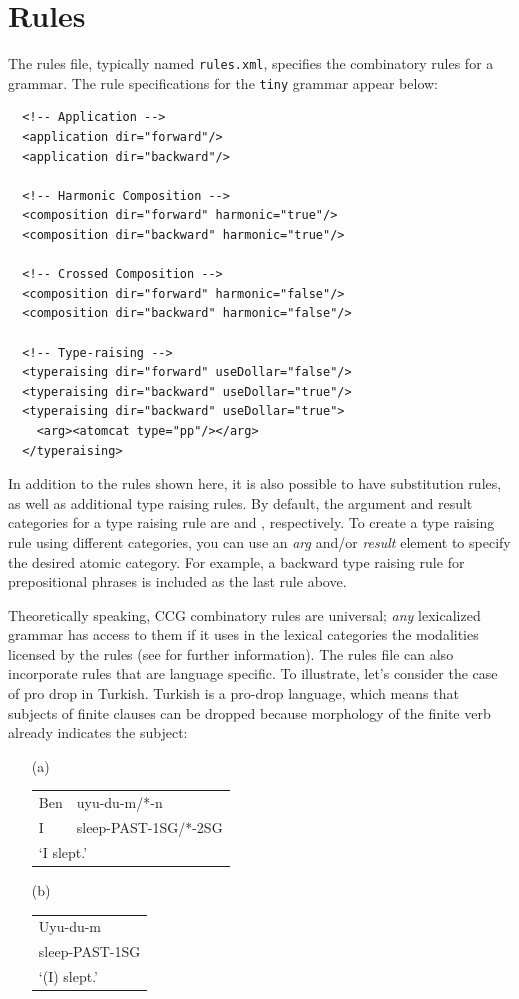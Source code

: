 \documentclass[11pt]{article}
\begin{document}
\section{Rules}
\label{rules}

The rules file, typically named \texttt{rules.xml}, specifies the
combinatory rules for a grammar. The rule specifications for the
\texttt{tiny} grammar appear below:

\begin{verbatim}
  <!-- Application -->
  <application dir="forward"/>
  <application dir="backward"/>

  <!-- Harmonic Composition -->
  <composition dir="forward" harmonic="true"/>
  <composition dir="backward" harmonic="true"/>

  <!-- Crossed Composition -->
  <composition dir="forward" harmonic="false"/>
  <composition dir="backward" harmonic="false"/>

  <!-- Type-raising -->
  <typeraising dir="forward" useDollar="false"/>
  <typeraising dir="backward" useDollar="true"/>
  <typeraising dir="backward" useDollar="true">
    <arg><atomcat type="pp"/></arg>
  </typeraising>
\end{verbatim}

\noindent In addition to the rules shown here, it is also possible to
have substitution rules, as well as additional type raising rules. By
default, the argument and result categories for a type raising rule are
 and , respectively. To create a type raising rule using
different categories, you can use an \textsl{arg} and/or \textsl{result}
element to specify the desired atomic category. For example, a backward
type raising rule for prepositional phrases is included as the last rule
above.

Theoretically speaking, CCG combinatory rules are universal; \emph{any}
lexicalized grammar has access to them if it uses in the lexical
categories the modalities licensed by the rules (see
\cite{Steedman/Baldridge:2003} for further information). The rules file
can also incorporate rules that are language specific. To illustrate,
let's consider the case of pro drop in Turkish. Turkish is a pro-drop
language, which means that subjects of finite clauses can be dropped
because morphology of the finite verb already indicates the subject:

\begin{itemize}
\item[(a)]
\begin{tabular}{ll}
Ben & uyu-du-m/*-n \\
I & sleep-PAST-1SG/*-2SG \\
\multicolumn{2}{l}{`I slept.'} \\
\end{tabular}

\item[(b)]
\begin{tabular}{l}
Uyu-du-m \\
sleep-PAST-1SG \\
`(I) slept.' \\
\end{tabular}
\end{itemize}
\end{document}
